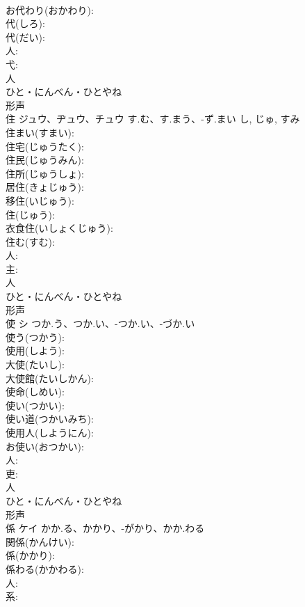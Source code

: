 \documentclass[8pt]{extreport}
\begin{document}
\begin{CJK}{UTF8}{min}
\\	お代わり(おかわり): 
\\	代(しろ): 
\\	代(だい): 
\\	人: 
\\	弋: 
\\	人	
\\	ひと・にんべん・ひとやね	
\\	形声 
\\	住	ジュウ、ヂュウ、チュウ	す.む、す.まう、-ず.まい	し, じゅ, すみ	
\\	住まい(すまい): 
\\	住宅(じゅうたく): 
\\	住民(じゅうみん): 
\\	住所(じゅうしょ): 
\\	居住(きょじゅう): 
\\	移住(いじゅう): 
\\	住(じゅう): 
\\	衣食住(いしょくじゅう): 
\\	住む(すむ): 
\\	人: 
\\	主: 
\\	人	
\\	ひと・にんべん・ひとやね	
\\	形声 
\\	使	シ	つか.う、つか.い、-つか.い、-づか.い		
\\	使う(つかう): 
\\	使用(しよう): 
\\	大使(たいし): 
\\	大使館(たいしかん): 
\\	使命(しめい): 
\\	使い(つかい): 
\\	使い道(つかいみち): 
\\	使用人(しようにん): 
\\	お使い(おつかい): 
\\	人: 
\\	吏: 
\\	人	
\\	ひと・にんべん・ひとやね	
\\	形声 
\\	係	ケイ	かか.る、かかり、-がかり、かか.わる		
\\	関係(かんけい): 
\\	係(かかり): 
\\	係わる(かかわる): 
\\	人: 
\\	系: 

\end{CJK}
\end{document}
